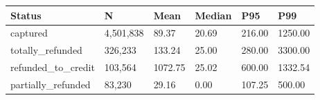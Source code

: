 \begin{tabular}{llllll}
\toprule
Status & N & Mean & Median & P95 & P99 \\
\midrule
captured & 4,501,838 & 89.37 & 20.69 & 216.00 & 1250.00 \\
totally_refunded & 326,233 & 133.24 & 25.00 & 280.00 & 3300.00 \\
refunded_to_credit & 103,564 & 1072.75 & 25.02 & 600.00 & 1332.54 \\
partially_refunded & 83,230 & 29.16 & 0.00 & 107.25 & 500.00 \\
\bottomrule
\end{tabular}

